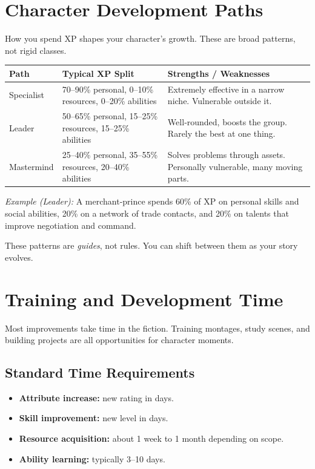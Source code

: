 \newpage
\section{Character Development Paths}
\label{sec:development-paths}

How you spend XP shapes your character's growth. These are broad patterns, not
rigid classes.

\begin{center}
\begin{tabular}{p{3cm}p{2.8cm}p{6cm}}
\toprule
\textbf{Path} & \textbf{Typical XP Split} & \textbf{Strengths / Weaknesses} \\
\midrule
Specialist & 70--90\% personal, 0--10\% resources, 0--20\% abilities & Extremely effective in a narrow niche. Vulnerable outside it. \\
Leader     & 50--65\% personal, 15--25\% resources, 15--25\% abilities & Well‑rounded, boosts the group. Rarely the best at one thing. \\
Mastermind & 25--40\% personal, 35--55\% resources, 20--40\% abilities & Solves problems through assets. Personally vulnerable, many moving parts. \\
\bottomrule
\end{tabular}
\end{center}

\noindent\textit{Example (Leader):} A merchant‑prince spends 60\% of XP on personal
skills and social abilities, 20\% on a network of trade contacts, and 20\% on
talents that improve negotiation and command.

These patterns are \emph{guides}, not rules. You can shift between them as your
story evolves.

\section{Training and Development Time}
\label{sec:training-time}

Most improvements take time in the fiction. Training montages, study scenes,
and building projects are all opportunities for character moments.

\subsection{Standard Time Requirements}
\label{sec:standard-training}
\begin{itemize}
  \item \textbf{Attribute increase:} new rating in days.
  \item \textbf{Skill improvement:} new level in days.
  \item \textbf{Resource acquisition:} about 1 week to 1 month depending on scope.
  \item \textbf{Ability learning:} typically 3–10 days.
\end{itemize}

